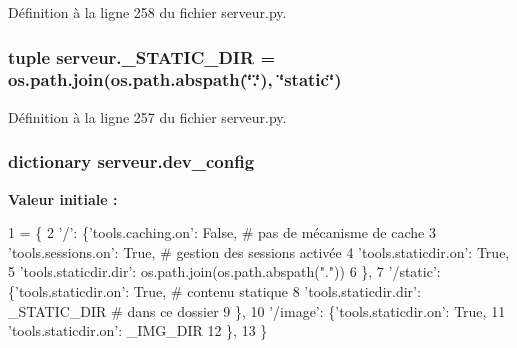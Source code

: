 Définition à la ligne 258 du fichier serveur.\-py.

\hypertarget{namespaceserveur_a67de12cb5d8d1fc1b938786191e6e7a3}{
\subsubsection[{\-\_\-\-S\-T\-A\-T\-I\-C\-\_\-\-D\-I\-R}]{\setlength{\rightskip}{0pt plus 5cm}tuple serveur.\-\_\-\-S\-T\-A\-T\-I\-C\-\_\-\-D\-I\-R = os.\-path.\-join(os.\-path.\-abspath(\char`\"{}.\char`\"{}), \char`\"{}static\char`\"{})}}\label{namespaceserveur_a67de12cb5d8d1fc1b938786191e6e7a3}


Définition à la ligne 257 du fichier serveur.\-py.

\hypertarget{namespaceserveur_ab0d89e80607d8c3e353fbdec568c25c1}{
\subsubsection[{dev\-\_\-config}]{\setlength{\rightskip}{0pt plus 5cm}dictionary serveur.\-dev\-\_\-config}}\label{namespaceserveur_ab0d89e80607d8c3e353fbdec568c25c1}
{\bfseries Valeur initiale \-:}
\begin{DoxyCode}
1 = \{
2     \textcolor{stringliteral}{'/'}:       \{\textcolor{stringliteral}{'tools.caching.on'}: \textcolor{keyword}{False}, \textcolor{comment}{# pas de mécanisme de cache}
3                 \textcolor{stringliteral}{'tools.sessions.on'}: \textcolor{keyword}{True},  \textcolor{comment}{# gestion des sessions activée}
4                 \textcolor{stringliteral}{'tools.staticdir.on'}: \textcolor{keyword}{True},
5                 \textcolor{stringliteral}{'tools.staticdir.dir'}: os.path.join(os.path.abspath(\textcolor{stringliteral}{"."}))
6                 \},
7     \textcolor{stringliteral}{'/static'}: \{\textcolor{stringliteral}{'tools.staticdir.on'}: \textcolor{keyword}{True},        \textcolor{comment}{# contenu statique}
8                 \textcolor{stringliteral}{'tools.staticdir.dir'}: \_STATIC\_DIR \textcolor{comment}{# dans ce dossier}
9                 \},
10     \textcolor{stringliteral}{'/image'}: \{\textcolor{stringliteral}{'tools.staticdir.on'}: \textcolor{keyword}{True},
11                 \textcolor{stringliteral}{'tools.staticdir.on'}: \_IMG\_DIR
12                 \},
13     \}
\end{DoxyCode}


